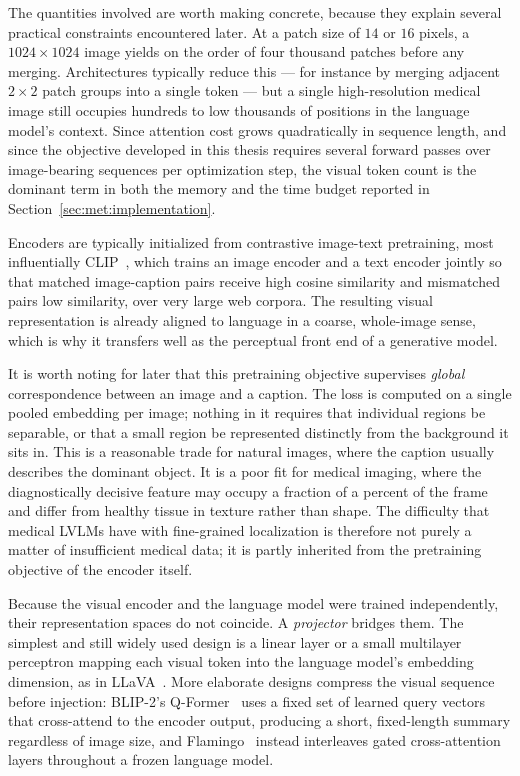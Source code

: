 The quantities involved are worth making concrete, because they explain several practical constraints encountered later. At a patch size of $14$ or $16$ pixels, a $1024 \times 1024$ image yields on the order of four thousand patches before any merging. Architectures typically reduce this --- for instance by merging adjacent $2 \times 2$ patch groups into a single token --- but a single high-resolution medical image still occupies hundreds to low thousands of positions in the language model's context. Since attention cost grows quadratically in sequence length, and since the objective developed in this thesis requires several forward passes over image-bearing sequences per optimization step, the visual token count is the dominant term in both the memory and the time budget reported in Section~\ref{sec:met:implementation}.

Encoders are typically initialized from contrastive image-text pretraining, most influentially CLIP~\cite{radford2021learning}, which trains an image encoder and a text encoder jointly so that matched image-caption pairs receive high cosine similarity and mismatched pairs low similarity, over very large web corpora. The resulting visual representation is already aligned to language in a coarse, whole-image sense, which is why it transfers well as the perceptual front end of a generative model.

It is worth noting for later that this pretraining objective supervises \emph{global} correspondence between an image and a caption. The loss is computed on a single pooled embedding per image; nothing in it requires that individual regions be separable, or that a small region be represented distinctly from the background it sits in. This is a reasonable trade for natural images, where the caption usually describes the dominant object. It is a poor fit for medical imaging, where the diagnostically decisive feature may occupy a fraction of a percent of the frame and differ from healthy tissue in texture rather than shape. The difficulty that medical LVLMs have with fine-grained localization is therefore not purely a matter of insufficient medical data; it is partly inherited from the pretraining objective of the encoder itself.

Because the visual encoder and the language model were trained independently, their representation spaces do not coincide. A \emph{projector} bridges them. The simplest and still widely used design is a linear layer or a small multilayer perceptron mapping each visual token into the language model's embedding dimension, as in LLaVA~\cite{liu2023visual, liu2024improved}. More elaborate designs compress the visual sequence before injection: BLIP-2's Q-Former~\cite{li2023blip2} uses a fixed set of learned query vectors that cross-attend to the encoder output, producing a short, fixed-length summary regardless of image size, and Flamingo~\cite{alayrac2022flamingo} instead interleaves gated cross-attention layers throughout a frozen language model.


